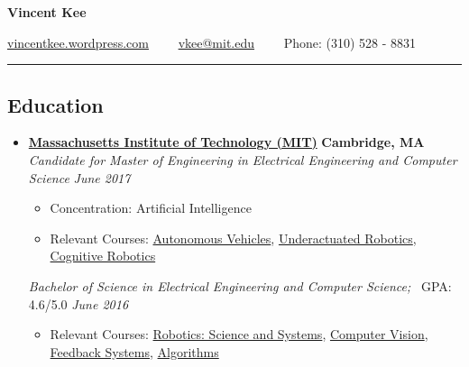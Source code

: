 \documentclass[10pt,letterpaper]{article}
\begin{document}
\begin{center}
{\huge \textbf{Vincent Kee}}

\href{http://vincentkee.wordpress.com}{vincentkee.wordpress.com}\ \ \textbullet
\ \ \href{mailto:vkee@mit.edu}{vkee@mit.edu}\ \ \textbullet
\ \  Phone: (310) 528 - 8831
\end{center}

\hrule
\vspace{-0.6em}

\subsection*{Education}
  \begin{itemize}
    \parskip=-0.1em

    \item[]
    {\href{http://mit.edu/}{\textbf{Massachusetts Institute of Technology (MIT)}} \hfill
      \textbf{Cambridge, MA}}
    \\
        {\emph{Candidate for Master of Engineering in Electrical Engineering and Computer Science}\hfill 
        \emph{June 2017}} 
        \begin{itemize}	
            \parskip=-0.1em
        \item[] Concentration: Artificial Intelligence
        \item[] Relevant Courses: \href{http://student.mit.edu/catalog/search.cgi?search=2.166&style=verbatim}{Autonomous Vehicles}, \href{http://student.mit.edu/catalog/search.cgi?search=6.832&style=verbatim}{Underactuated Robotics}, \href{http://student.mit.edu/catalog/search.cgi?search=6.834&style=verbatim}{Cognitive Robotics}
         \end{itemize}
    {\emph{Bachelor of Science in Electrical Engineering and Computer Science;} \, GPA: 4.6/5.0 \hfill
      \emph{June 2016}}
      \begin{itemize}
          \parskip=-0.1em
      \item[] Relevant Courses: \href{http://student.mit.edu/catalog/search.cgi?search=6.141&style=verbatim}{Robotics: Science and Systems}, \href{http://student.mit.edu/catalog/search.cgi?search=6.869&style=verbatim}{Computer Vision}, \href{http://student.mit.edu/catalog/search.cgi?search=6.302&style=verbatim}{Feedback Systems}, \href{http://student.mit.edu/catalog/search.cgi?search=6.006&style=verbatim}{Algorithms}
   \end{itemize}   
  \end{itemize}
\end{document}

